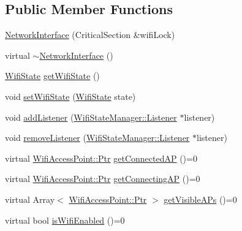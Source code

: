 \subsection*{Public Member Functions}
\begin{DoxyCompactItemize}
\item 
\mbox{\hyperlink{classWifiStateManager_1_1NetworkInterface_a5b438ba9ecda0b255916ff1ab160d457}{Network\+Interface}} (Critical\+Section \&wifi\+Lock)
\item 
virtual \mbox{\hyperlink{classWifiStateManager_1_1NetworkInterface_a89d73a6b2a7eaf74882501a4e62f2569}{$\sim$\+Network\+Interface}} ()
\item 
\mbox{\hyperlink{classWifiStateManager_a1b2ed840606c57c43d4a147c96d43128}{Wifi\+State}} \mbox{\hyperlink{classWifiStateManager_1_1NetworkInterface_a15bec43de60c0e31694b28d2362c894f}{get\+Wifi\+State}} ()
\item 
void \mbox{\hyperlink{classWifiStateManager_1_1NetworkInterface_acbe026d2598cf8438ff470325a12cdc4}{set\+Wifi\+State}} (\mbox{\hyperlink{classWifiStateManager_a1b2ed840606c57c43d4a147c96d43128}{Wifi\+State}} state)
\item 
void \mbox{\hyperlink{classWifiStateManager_1_1NetworkInterface_a10613ea1fe2bfbf47c1605b0eb224fef}{add\+Listener}} (\mbox{\hyperlink{classWifiStateManager_1_1Listener}{Wifi\+State\+Manager\+::\+Listener}} $\ast$listener)
\item 
void \mbox{\hyperlink{classWifiStateManager_1_1NetworkInterface_a0019ba49d65a7d3351469768f4d44bdf}{remove\+Listener}} (\mbox{\hyperlink{classWifiStateManager_1_1Listener}{Wifi\+State\+Manager\+::\+Listener}} $\ast$listener)
\item 
virtual \mbox{\hyperlink{classWifiAccessPoint_ad18977f884076774803027efbaa131a0}{Wifi\+Access\+Point\+::\+Ptr}} \mbox{\hyperlink{classWifiStateManager_1_1NetworkInterface_a924f90089b1d0a64771b904bc96ce81a}{get\+Connected\+AP}} ()=0
\item 
virtual \mbox{\hyperlink{classWifiAccessPoint_ad18977f884076774803027efbaa131a0}{Wifi\+Access\+Point\+::\+Ptr}} \mbox{\hyperlink{classWifiStateManager_1_1NetworkInterface_abff4fdeee0026c367dccc03828a88cc2}{get\+Connecting\+AP}} ()=0
\item 
virtual Array$<$ \mbox{\hyperlink{classWifiAccessPoint_ad18977f884076774803027efbaa131a0}{Wifi\+Access\+Point\+::\+Ptr}} $>$ \mbox{\hyperlink{classWifiStateManager_1_1NetworkInterface_a898004009e9645ad96a777ca2ee6a245}{get\+Visible\+A\+Ps}} ()=0
\item 
virtual bool \mbox{\hyperlink{classWifiStateManager_1_1NetworkInterface_aefcafd5baac9715524c60d65b0f523ce}{is\+Wifi\+Enabled}} ()=0

\end{DoxyCompactItemize}
